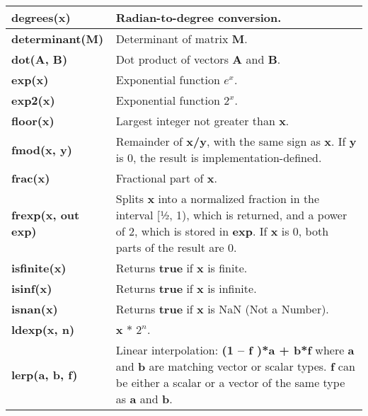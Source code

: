 \documentclass[../main.tex]{subfiles}
\begin{document}
\begin{longtable}{ p{3cm} p{9cm}  }
\hline
\textbf{degrees(x)} & Radian-to-degree conversion. \\
\hline
\textbf{determinant(M)} & Determinant of matrix \textbf{M}. \\
\hline
\textbf{dot(A, B)} & Dot product of vectors \textbf{A} and \textbf{B}. \\
\hline
\textbf{exp(x)} & Exponential function $e^x$. \\
\hline
\textbf{exp2(x)} & Exponential function $2^x$. \\
\hline
\textbf{floor(x)} & Largest integer not greater than \textbf{x}. \\
\hline
\textbf{fmod(x, y)} & Remainder of \textbf{x/y}, with the same sign as \textbf{x}. \newline If \textbf{y} is 0, the result is implementation-defined. \\
\hline
\textbf{frac(x)} & Fractional part of \textbf{x}. \\
\hline
\textbf{frexp(x, out exp)} & Splits \textbf{x} into a normalized fraction in the interval [½, 1), which is returned, and a power of 2, which is stored in \textbf{exp}. \newline If \textbf{x} is 0, both parts of the result are 0. \\
\hline
\textbf{isfinite(x)} & Returns \textbf{true} if \textbf{x} is finite. \\
\hline
\textbf{isinf(x)} & Returns \textbf{true} if \textbf{x} is infinite. \\
\hline
\textbf{isnan(x)} & Returns \textbf{true} if \textbf{x} is NaN (Not a Number). \\
\hline
\textbf{ldexp(x, n)} & \textbf{x} $*$ $2^n$. \\
\hline
\textbf{lerp(a, b, f)} & Linear interpolation: \newline \textbf{(1 – f )*a + b*f} \newline where \textbf{a} and \textbf{b} are matching vector or scalar types. \textbf{f} can be either a scalar or a vector of the same type as \textbf{a} and \textbf{b}. \\
\hline

\end{longtable}
\end{document}
